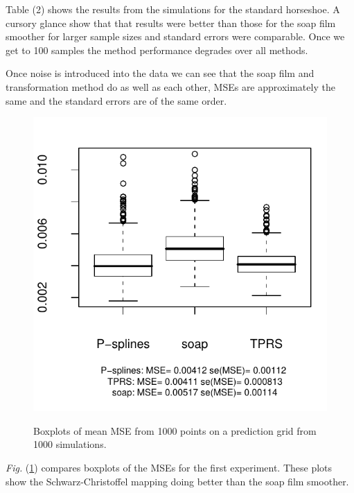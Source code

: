 \documentclass[a4paper,10pt]{amsart}
\newcommand{\sch}{Schwarz-Christoffel }
\newcommand{\Fig}[1]{\emph{Fig.} (\ref{#1})}
\begin{document}
Table (2) shows the results from the simulations for the standard horseshoe. A cursory glance show that that results were better than those for the soap film smoother for larger sample sizes and standard errors were comparable. Once we get to 100 samples the method performance degrades over all methods.

Once noise is introduced into the data we can see that the soap film and transformation method do as well as each other, MSEs are approximately the same and the standard errors are of the same order.

\begin{figure}
\centering
\includegraphics{figs/mses-boxplot.pdf} \\
\caption{Boxplots of mean MSE from 1000 points on a prediction grid from 1000 simulations.}
\label{1000boxplots}
\end{figure}

\Fig{1000boxplots} compares boxplots of the MSEs for the first experiment. These plots show the \sch mapping doing better than the soap film smoother.
\end{document}
